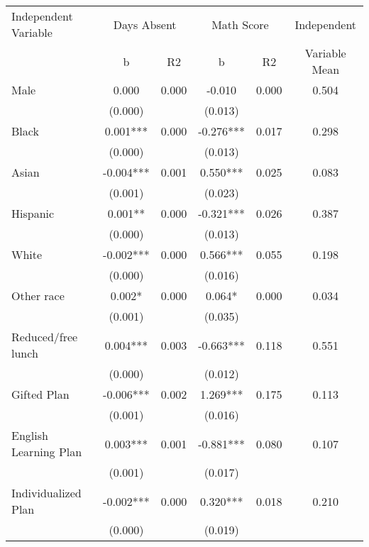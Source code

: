\begin{tabular}{lccccc}
\toprule
\toprule
Independent Variable & \multicolumn{2}{c}{Days Absent} & \multicolumn{2}{c}{Math Score} & Independent  \\
 & b & R2 & b & R2 & Variable Mean \\
\midrule 
Male & 0.000 &  0.000 & -0.010 & 0.000 & 0.504 \\
 & (0.000) &  & (0.013) & &  \\
Black & 0.001*** &  0.000 & -0.276*** & 0.017 & 0.298 \\
 & (0.000) &  & (0.013) & &  \\
Asian & -0.004*** &  0.001 & 0.550*** & 0.025 & 0.083 \\
 & (0.001) &  & (0.023) & &  \\
Hispanic & 0.001** &  0.000 & -0.321*** & 0.026 & 0.387 \\
 & (0.000) &  & (0.013) & &  \\
White & -0.002*** &  0.000 & 0.566*** & 0.055 & 0.198 \\
 & (0.000) &  & (0.016) & &  \\
Other race & 0.002* &  0.000 & 0.064* & 0.000 & 0.034 \\
 & (0.001) &  & (0.035) & &  \\
Reduced/free lunch & 0.004*** &  0.003 & -0.663*** & 0.118 & 0.551 \\
 & (0.000) &  & (0.012) & &  \\
Gifted Plan & -0.006*** &  0.002 & 1.269*** & 0.175 & 0.113 \\
 & (0.001) &  & (0.016) & &  \\
English Learning Plan & 0.003*** &  0.001 & -0.881*** & 0.080 & 0.107 \\
 & (0.001) &  & (0.017) & &  \\
Individualized Plan & -0.002*** &  0.000 & 0.320*** & 0.018 & 0.210 \\
 & (0.000) &  & (0.019) & &  \\
\bottomrule
\bottomrule
\end{tabular}
